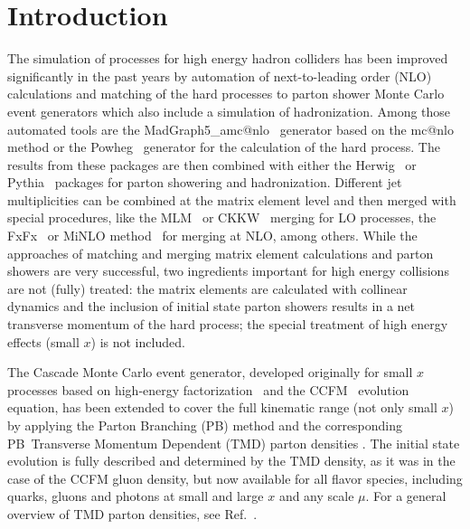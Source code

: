 \documentclass[11pt]{article} \usepackage{mystyle-new}
\makeatletter
\def\powheg{{\sc Powheg}}
\def\herwig{{\sc Herwig}}
\def\pythia{{\sc Pythia}}
\def\mcatnlo{{\sc mc@nlo}}
\def\MGvATNLO{{\sc MadGraph5}\_a{\sc mc@nlo}}
\def\PB{{PB}}
\newcommand{\ccfm}{Ciafaloni:1987ur,Catani:1989yc,Catani:1989sg,Marchesini:1994wr}
\makeatother
\begin{document}

\section{Introduction}

The simulation of processes for high energy hadron colliders has been improved significantly in the past years by automation of next-to-leading order (NLO) calculations and matching of the hard processes to parton shower Monte Carlo event generators which also include a simulation of hadronization. Among those automated tools are the \MGvATNLO~\cite{Alwall:2014hca} generator based on the  \mcatnlo~  method or the \powheg~\cite{Alioli:2010xa,Frixione:2007vw} generator for the calculation of the hard process. The results from these packages are then combined with either the \herwig~\cite{Bahr:2008pv} or \pythia~\cite{Sjostrand:2014zea} packages for parton showering and hadronization. Different jet multiplicities can be combined at the matrix element level and then merged with special procedures, like the MLM~\cite{Alwall:2007fs} or CKKW~\cite{Catani:2001cc} merging for LO processes,  the FxFx~\cite{Frederix:2012ps} or MiNLO method~\cite{Hamilton:2012np} for merging at NLO, among others.
While the approaches of matching and merging matrix element calculations and parton showers are very successful, two ingredients important for high energy collisions are not (fully) treated:  the matrix elements are calculated with collinear dynamics and the inclusion of initial state parton showers results in a net transverse momentum of the hard process;  the special treatment of high energy effects (small $x$) is not included. 

The {\sc Cascade} Monte Carlo event generator, developed originally for small $x$ processes based on high-energy factorization~ \cite{Catani:1990xk} and the CCFM~\cite{\ccfm} evolution equation, has been extended to cover the full kinematic range (not only small $x$) by applying the Parton Branching (\PB) method and the corresponding \PB\   Transverse Momentum Dependent (TMD) parton densities  \cite{Hautmann:2017fcj,Hautmann:2017xtx}. The initial state evolution is fully described and determined by the TMD density, as it was in the case of the CCFM gluon density, but now available for all flavor species, including quarks, gluons and photons at small and large $x$ and any scale $\mu$. For a general overview of TMD parton densities, see Ref.~\cite{Angeles-Martinez:2015sea}.
\end{document}
